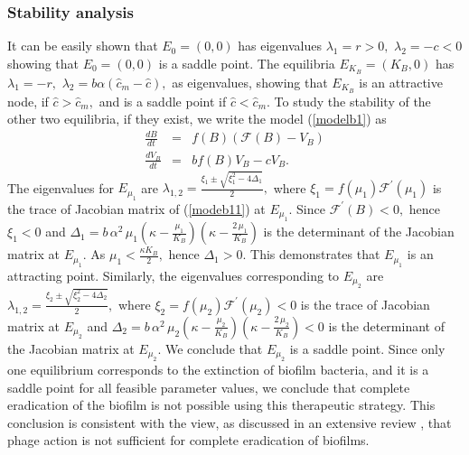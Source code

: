 \subsubsection{Stability analysis}
It can be easily shown that $E_{0}=(0,0)$ has eigenvalues
$\lambda_{1}=r>0, \,\, \lambda_{2}=-c<0$
showing that $E_{0}=(0,0)$ is a saddle point. The equilibria $E_{K_{B}}=(K_{B},0)$ has
$\lambda_{1}=-r, \,\, \lambda_{2}=b\alpha(\hat{c}_{m}-\hat{c}),$ as eigenvalues, showing that $E_{K_{B}}$ is an attractive node, if $\hat{c}>\hat{c}_{m},$ and is a saddle point if $\hat{c}< \hat{c}_{m}.$ To study the stability of the other two equilibria, if they exist, we write the model (\ref{modelb1}) as
\begin{eqnarray}\label{modeb11}
\frac{dB}{dt} &=& f(B)\left(\mathcal{F}(B)- V_{B}\right)\nonumber\\
\frac{d V_{B}}{dt} &=& bf(B)V_{B}-cV_{B}.
\end{eqnarray}
The eigenvalues for $E_{\mu_{1}}$ are $\lambda_{1,2}=\frac{\xi_{1}\pm\sqrt{\xi_{1}^{2}-4\Delta_{1}}}{2},$ where
$\xi_{1}=f(\mu_{1})\mathcal{F}^{'}(\mu_{1})$
is the trace of Jacobian matrix of (\ref{modeb11}) at $E_{\mu_{1}}.$ Since $\mathcal{F}^{'}(B)<0,$ hence $\xi_{1}<0$ and 
$\Delta_{1} = b \, \alpha^{2}\, \mu_{1} \left(\kappa-\frac{\mu_{1}}{K_{B}}\right)\left(\kappa - \frac{2\, \mu_{1}}{K_{B}}\right)$
is the determinant of the Jacobian matrix at $E_{\mu_{1}}.$ As $\mu_{1}<\frac{\kappa K_{B}}{2},$ hence $\Delta_{1}>0.$ This demonstrates that $E_{\mu_{1}}$ is an attracting point. Similarly, the eigenvalues corresponding to $E_{\mu_{2}}$ are $\lambda_{1,2}=\frac{\xi_{2} \pm \sqrt{\xi_{2}^{2}-4\Delta_{2}}}{2},$
where $\xi_{2}=f(\mu_{2})\mathcal{F}^{'}(\mu_{2})<0$
is the trace of Jacobian matrix at $E_{\mu_{2}}$ and $\Delta_{2}= b \, \alpha^{2}\, \mu_{2} \left(\kappa-\frac{\mu_{2}}{K_{B}}\right)\left(\kappa - \frac{2\, \mu_{2}}{K_{B}}\right)<0$
is the determinant of the Jacobian matrix at $E_{\mu_{2}}.$ We conclude that $E_{\mu_{2}}$ is a saddle point.  Since only one equilibrium corresponds to the extinction of biofilm bacteria, and it is a saddle point for all feasible  parameter values, we conclude that complete eradication of the biofilm is not possible using this therapeutic strategy. {\color{black} This conclusion is consistent with the view, as discussed in an extensive review \citep{abedon_ecology_2015II}, that phage action is not sufficient for complete eradication of biofilms.}

